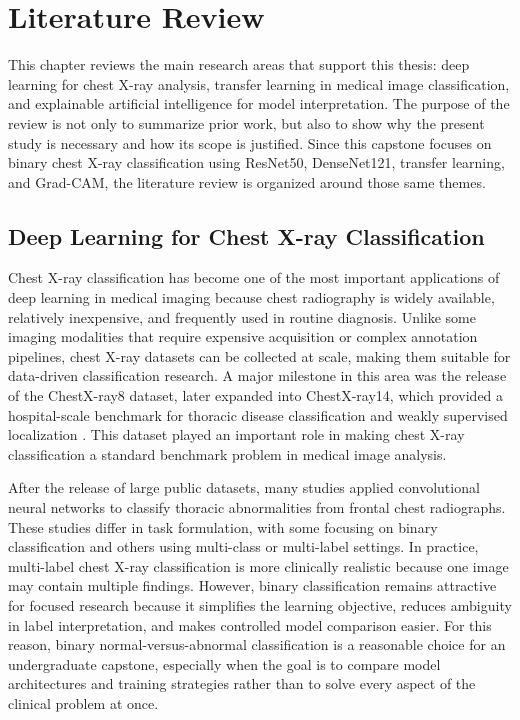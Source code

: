 \chapter{Literature Review}

This chapter reviews the main research areas that support this thesis: deep learning for chest X-ray analysis, transfer learning in medical image classification, and explainable artificial intelligence for model interpretation. The purpose of the review is not only to summarize prior work, but also to show why the present study is necessary and how its scope is justified. Since this capstone focuses on binary chest X-ray classification using ResNet50, DenseNet121, transfer learning, and Grad-CAM, the literature review is organized around those same themes.

\section{Deep Learning for Chest X-ray Classification}
Chest X-ray classification has become one of the most important applications of deep learning in medical imaging because chest radiography is widely available, relatively inexpensive, and frequently used in routine diagnosis. Unlike some imaging modalities that require expensive acquisition or complex annotation pipelines, chest X-ray datasets can be collected at scale, making them suitable for data-driven classification research. A major milestone in this area was the release of the ChestX-ray8 dataset, later expanded into ChestX-ray14, which provided a hospital-scale benchmark for thoracic disease classification and weakly supervised localization \cite{ref:wang2017}. This dataset played an important role in making chest X-ray classification a standard benchmark problem in medical image analysis.

After the release of large public datasets, many studies applied convolutional neural networks to classify thoracic abnormalities from frontal chest radiographs. These studies differ in task formulation, with some focusing on binary classification and others using multi-class or multi-label settings. In practice, multi-label chest X-ray classification is more clinically realistic because one image may contain multiple findings. However, binary classification remains attractive for focused research because it simplifies the learning objective, reduces ambiguity in label interpretation, and makes controlled model comparison easier. For this reason, binary normal-versus-abnormal classification is a reasonable choice for an undergraduate capstone, especially when the goal is to compare model architectures and training strategies rather than to solve every aspect of the clinical problem at once.

